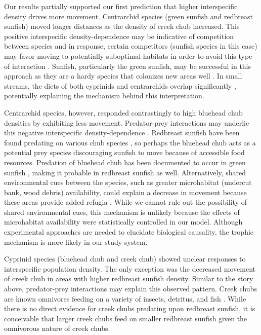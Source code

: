 \documentclass[11pt, class=article, crop=false]{standalone}
\begin{document}
Our results partially supported our first prediction that higher interspecific density drives more movement. Centrarchid species (green sunfish and redbreast sunfish) moved longer distances as the density of creek chub increased. This positive interspecific density-dependence may be indicative of competition between species and in response, certain competitors (sunfish species in this case) may favor moving to potentially suboptimal habitats in order to avoid this type of interaction \citep{jacobHabitatChoiceMeets2018, thierryInterplayAbioticBiotic2024}. Sunfish, particularly the green sunfish, may be successful in this approach as they are a hardy species that colonizes new areas well \citep{lemlySuppressionNativeFish1985, moyleInlandFishesCalifornia2002}. In small streams, the diets of both cyprinids and centrarchids overlap significantly \citep{collarPISCIVORYLIMITSDIVERSIFICATION2009, lemlySuppressionNativeFish1985, karrAssessmentBioticIntegrity1981, leonardApplicationTestingIndex1986}, potentially explaining the mechanism behind this interpretation.  

Centrarchid species, however, responded contrastingly to high bluehead chub densities by exhibiting less movement. Predator-prey interactions may underlie this negative interspecific density-dependence \citep{jacobHabitatMatchingSpatial2015}. Redbreast sunfish have been found predating on various chub species \citep{borrelliPuttingLakeTogether2023}, so perhaps the bluehead chub acts as a potential prey species discouraging sunfish to move because of accessible food resources. Predation of bluehead chub has been documented to occur in green sunfish \citep{lemlySuppressionNativeFish1985}, making it probable in redbreast sunfish as well. Alternatively, shared environmental cues between the species, such as greater microhabitat (undercut bank, wood debris) availability, could explain a decrease in movement because these areas provide added refugia \citep{careyEffectsLittoralHabitat2010}. While we cannot rule out the possibility of shared environmental cues, this mechanism is unlikely because the effects of microhabitat availability were statistically controlled in our model. Although experimental approaches are needed to elucidate biological causality, the trophic mechanism is more likely in our study system. 

Cyprinid species (bluehead chub and creek chub) showed unclear responses to interspecific population density. The only exception was the decreased movement of creek chub in areas with higher redbreast sunfish density. Similar to the story above, predator-prey interactions may explain this observed pattern. Creek chubs are known omnivores feeding on a variety of insects, detritus, and fish \citep{champagneRiparianBuffersMaintain2022, leonardApplicationTestingIndex1986, quistSummerFoodHabits2006}. While there is no direct evidence for creek chubs predating upon redbreast sunfish, it is conceivable that larger creek chubs feed on smaller redbreast sunfish given the omnivorous nature of creek chubs.
\end{document}
